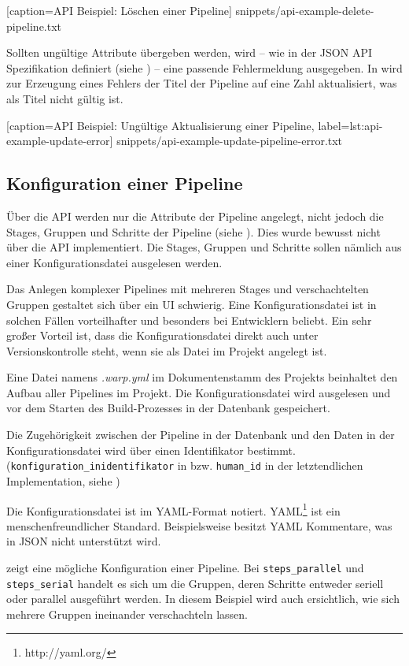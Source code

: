 
  [caption={API Beispiel: Löschen einer Pipeline}]
  {snippets/api-example-delete-pipeline.txt}

Sollten ungültige Attribute übergeben werden, wird – wie in der JSON API Spezifikation definiert (siehe ) – eine passende Fehlermeldung ausgegeben. In  wird zur Erzeugung eines Fehlers der Titel der Pipeline auf eine Zahl aktualisiert, was als Titel nicht gültig ist.


  [caption={API Beispiel: Ungültige Aktualisierung einer Pipeline},
  label={lst:api-example-update-error}]
  {snippets/api-example-update-pipeline-error.txt}


\subsection{Konfiguration einer Pipeline}

Über die API werden nur die Attribute der Pipeline angelegt, nicht jedoch die Stages, Gruppen und Schritte der Pipeline (siehe ). Dies wurde bewusst nicht über die API implementiert. Die Stages, Gruppen und Schritte sollen nämlich aus einer Konfigurationsdatei ausgelesen werden.

Das Anlegen komplexer Pipelines mit mehreren Stages und verschachtelten Gruppen gestaltet sich über ein \acf{UI} schwierig. Eine Konfigurationsdatei ist in solchen Fällen vorteilhafter und besonders bei Entwicklern beliebt. Ein sehr großer Vorteil ist, dass die Konfigurationsdatei direkt auch unter Versionskontrolle steht, wenn sie als Datei im Projekt angelegt ist.

Eine Datei namens \emph{.warp.yml} im Dokumentenstamm des Projekts beinhaltet den Aufbau aller Pipelines im Projekt. Die Konfigurationsdatei wird ausgelesen und vor dem Starten des Build-Prozesses in der Datenbank gespeichert.

Die Zugehörigkeit zwischen der Pipeline in der Datenbank und den Daten in der Konfigurationsdatei wird über einen Identifikator bestimmt. (\texttt{konfiguration\_\allowbreak inidentifikator} in  bzw. \texttt{human\_id} in der letztendlichen Implementation, siehe )

Die Konfigurationsdatei ist im YAML-Format notiert. YAML\footnote{http://yaml.org/} ist ein menschenfreundlicher Standard. Beispielsweise besitzt YAML Kommentare, was in JSON nicht unterstützt wird.

 zeigt eine mögliche Konfiguration einer Pipeline. Bei \texttt{steps\_\allowbreak parallel} und \texttt{steps\_\allowbreak serial} handelt es sich um die Gruppen, deren Schritte entweder seriell oder parallel ausgeführt werden. In diesem Beispiel wird auch ersichtlich, wie sich mehrere Gruppen ineinander verschachteln lassen.

